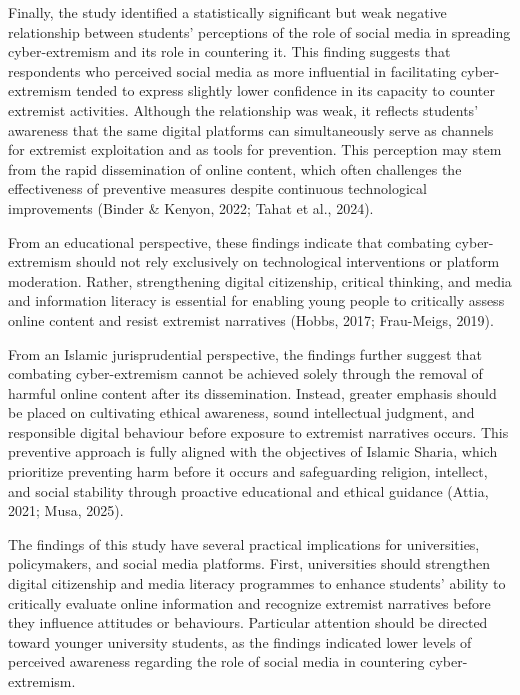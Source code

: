 \documentclass{NSP1}
\begin{document}
Finally, the study identified a statistically significant but weak negative relationship between students' perceptions of the role of social media in spreading cyber-extremism and its role in countering it. This finding suggests that respondents who perceived social media as more influential in facilitating cyber-extremism tended to express slightly lower confidence in its capacity to counter extremist activities. Although the relationship was weak, it reflects students' awareness that the same digital platforms can simultaneously serve as channels for extremist exploitation and as tools for prevention. This perception may stem from the rapid dissemination of online content, which often challenges the effectiveness of preventive measures despite continuous technological improvements (Binder \& Kenyon, 2022; Tahat et al., 2024).

From an educational perspective, these findings indicate that combating cyber-extremism should not rely exclusively on technological interventions or platform moderation. Rather, strengthening digital citizenship, critical thinking, and media and information literacy is essential for enabling young people to critically assess online content and resist extremist narratives (Hobbs, 2017; Frau-Meigs, 2019).

From an Islamic jurisprudential perspective, the findings further suggest that combating cyber-extremism cannot be achieved solely through the removal of harmful online content after its dissemination. Instead, greater emphasis should be placed on cultivating ethical awareness, sound intellectual judgment, and responsible digital behaviour before exposure to extremist narratives occurs. This preventive approach is fully aligned with the objectives of Islamic Sharia, which prioritize preventing harm before it occurs and safeguarding religion, intellect, and social stability through proactive educational and ethical guidance (Attia, 2021; Musa, 2025).

\par\medskip{}\smallskip

The findings of this study have several practical implications for universities, policymakers, and social media platforms. First, universities should strengthen digital citizenship and media literacy programmes to enhance students' ability to critically evaluate online information and recognize extremist narratives before they influence attitudes or behaviours. Particular attention should be directed toward younger university students, as the findings indicated lower levels of perceived awareness regarding the role of social media in countering cyber-extremism.
\end{document}
